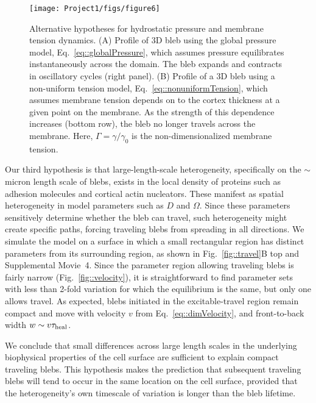 \begin{figure}
   \begin{center}
   \captionsetup{width=17cm}
     \texttt{[image: Project1/figs/figure6]}
      \caption{Alternative hypotheses for hydrostatic pressure and membrane tension dynamics. (A) Profile of 3D bleb using the global pressure model, Eq.~\ref{eq::globalPressure}, which assumes pressure equilibrates instantaneously across the domain. The bleb expands and contracts in oscillatory cycles (right panel). (B) Profile  of a 3D bleb using a non-uniform tension model, Eq.~\ref{eq::nonuniformTension}, which assumes membrane tension depends on to the cortex thickness at a given point on the membrane. As the strength of this dependence increases (bottom row), the bleb no longer travels across the membrane. Here, $\Gamma = \gamma/\gamma_0$ is the non-dimensionalized membrane tension.}
      \label{fig::variants}
   \end{center}
\end{figure}

Our third hypothesis is that large-length-scale heterogeneity, specifically on the $\sim$ micron length scale of blebs, exists in the local density of proteins such as adhesion molecules and cortical actin nucleators. These manifest as spatial heterogeneity in model parameters such as $D$ and $\Omega$. Since these parameters sensitively determine whether the bleb can travel, such heterogeneity might create specific paths, forcing traveling blebs from spreading in all directions. We simulate the model on a surface in which a small rectangular region has distinct parameters from its surrounding region, as shown in Fig.~\ref{fig::travel}B top and Supplemental Movie~4. Since the parameter region allowing traveling blebs is fairly narrow (Fig.~\ref{fig::velocity}), it is straightforward to find parameter sets with less than 2-fold variation for which the equilibrium is the same, but only one allows travel. As expected, blebs initiated in the excitable-travel region remain compact and move with velocity $v$ from Eq.~\ref{eq::dimVelocity}, and front-to-back width $w\sim v\tau_{\mbox{\scriptsize heal}}$. 

We conclude that small differences across large length scales in the underlying biophysical properties of the cell surface are sufficient to explain compact traveling blebs. This hypothesis makes the prediction that subsequent traveling blebs will tend to occur in the same location on the cell surface, provided that the heterogeneity's own timescale of variation is longer than the bleb lifetime. %


